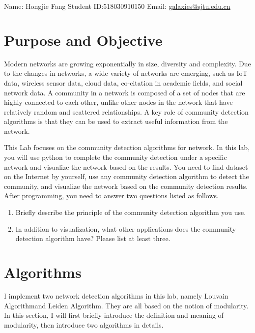 \documentclass[12pt, a4paper]{article}
\theoremstyle{definition}
\begin{document}
\noindent

\noindent{}
\begin{center}

Name: Hongjie Fang  \quad Student ID:518030910150 \quad Email: \href{mailto:galaxies@sjtu.edu.cn}{galaxies@sjtu.edu.cn}
\end{center}

\section{Purpose and Objective}\label{section1}

Modern networks are growing exponentially in size, diversity and complexity. Due to the changes in networks, a wide variety of networks are emerging, such as IoT data, wireless sensor data, cloud data, co-citation in academic fields, and social network data. A community in a network is composed of a set of nodes that are highly connected to each other, unlike other nodes in the network that have relatively random and scattered relationships. A key role of community detection algorithms is that they can be used to extract useful information from the network.

This Lab focuses on the community detection algorithms for network. In this lab, you will use python to complete the community detection under a specific network and visualize the network based on the results. You need to find dataset on the Internet by yourself, use any community detection algorithm to detect the community, and visualize the network based on the community detection results. After programming, you need to answer two questions listed as follows.

\begin{enumerate}
	\item Briefly describe the principle of the community detection algorithm you use.
	\item In addition to visualization, what other applications does the community detection algorithm have? Please list at least three.
\end{enumerate}

\section{Algorithms}
I implement two network detection algorithms in this lab, namely Louvain Algorithm\footnotemark[1] and Leiden Algorithm\footnotemark[2]. They are all based on the notion of modularity. In this section, I will first briefly introduce the definition and meaning of modularity, then introduce two algorithms in details.
\end{document}
